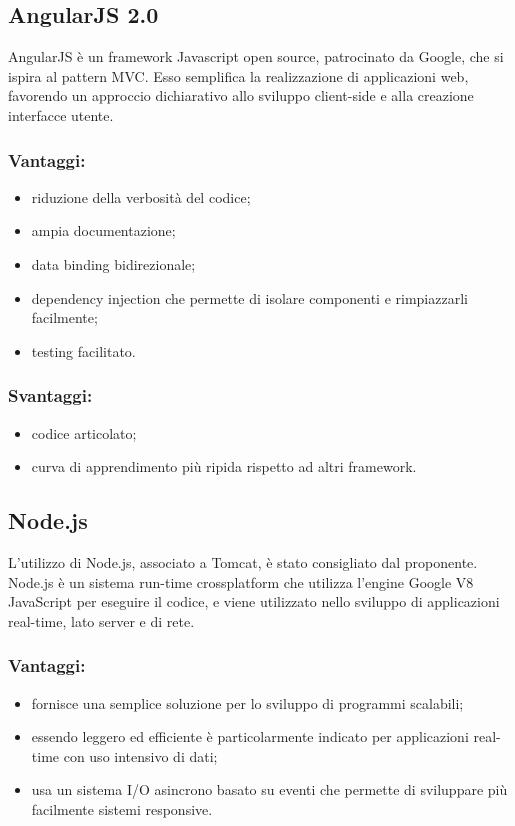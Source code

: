 \documentclass[a4paper, titlepage]{article}
\begin{document}
\subsection{AngularJS 2.0}
AngularJS è un framework Javascript open source, patrocinato da Google, che si ispira al pattern MVC.
Esso semplifica la realizzazione di applicazioni web, favorendo un approccio dichiarativo allo sviluppo client-side e alla creazione interfacce utente.

\subsubsection{Vantaggi:}

\begin{itemize}
	\item riduzione della verbosità del codice;
	\item ampia documentazione;
	\item data binding bidirezionale;
	\item dependency injection che permette di isolare componenti e rimpiazzarli facilmente;
	\item testing facilitato.
\end{itemize}

\subsubsection{Svantaggi:}

\begin{itemize}
	\item codice articolato;
	\item curva di apprendimento più ripida rispetto ad altri framework.
\end{itemize}

\subsection{Node.js}
L'utilizzo di Node.js, associato a Tomcat, è stato consigliato dal proponente. Node.js è un sistema run-time crossplatform che utilizza l’engine Google V8 JavaScript per eseguire il codice, e viene utilizzato nello sviluppo di applicazioni real-time, lato server e di rete.

\subsubsection{Vantaggi:}

\begin{itemize}
	\item fornisce una semplice soluzione per lo sviluppo di programmi scalabili;
	\item essendo leggero ed efficiente è particolarmente indicato per applicazioni real-time con uso intensivo di dati;
	\item usa un sistema I/O asincrono basato su eventi che permette di sviluppare più facilmente sistemi responsive.
\end{itemize}
\end{document}
